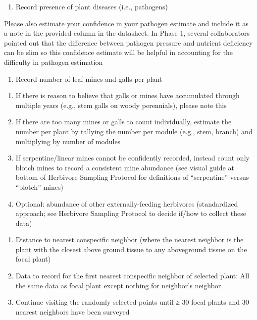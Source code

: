 \documentclass[
  letterpaper,
  DIV=11,
  numbers=noendperiod]{scrreprt}
\providecommand{\tightlist}{%
  \setlength{\itemsep}{0pt}\setlength{\parskip}{0pt}}\usepackage{longtable,booktabs,array}
\begin{document}
\begin{enumerate}
\def\labelenumi{\arabic{enumi}.}
\setcounter{enumi}{13}
\tightlist
\item
  Record presence of plant diseases (i.e., pathogens)
\end{enumerate}

Please also estimate your confidence in your pathogen estimate and
include it as a note in the provided column in the datasheet. In Phase
1, several collaborators pointed out that the difference between
pathogen pressure and nutrient deficiency can be slim so this confidence
estimate will be helpful in accounting for the difficulty in pathogen
estimation

\begin{enumerate}
\def\labelenumi{\arabic{enumi}.}
\setcounter{enumi}{14}
\tightlist
\item
  Record number of leaf mines and galls per plant
\end{enumerate}

\begin{enumerate}
\def\labelenumi{\alph{enumi}.}
\item
  If there is reason to believe that galls or mines have accumulated
  through multiple years (e.g., stem galls on woody perennials), please
  note this
\item
  If there are too many mines or galls to count individually, estimate
  the number per plant by tallying the number per module (e.g., stem,
  branch) and multiplying by number of modules
\item
  If serpentine/linear mines cannot be confidently recorded, instead
  count only blotch mines to record a consistent mine abundance (see
  visual guide at bottom of Herbivore Sampling Protocol for definitions
  of ``serpentine'' versus ``blotch'' mines)
\item
  Optional: abundance of other externally-feeding herbivores
  (standardized approach; see Herbivore Sampling Protocol to decide
  if/how to collect these data)
\end{enumerate}

\begin{enumerate}
\def\labelenumi{\arabic{enumi}.}
\setcounter{enumi}{15}
\item
  Distance to nearest conspecific neighbor (where the nearest neighbor
  is the plant with the closest above ground tissue to any aboveground
  tissue on the focal plant)
\item
  Data to record for the first nearest conspecific neighbor of selected
  plant: All the same data as focal plant except nothing for neighbor's
  neighbor
\item
  Continue visiting the randomly selected points until ≥ 30 focal plants
  and 30 nearest neighbors have been surveyed
\end{enumerate}
\end{document}
